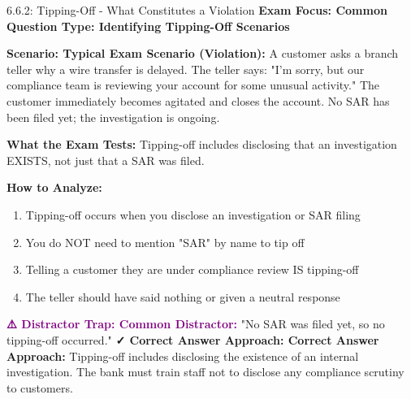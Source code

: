 \documentclass[11pt,a4paper]{beamer}
\newcommand{\examfocus}[1]{\textcolor{orange!80!black}{\textbf{Exam Focus: #1}}}
\newcommand{\trap}[1]{\textcolor{purple}{\textbf{⚠️ Distractor Trap: #1}}}
\newcommand{\correct}[1]{\textcolor{green!50!black}{\textbf{✓ Correct Answer Approach: #1}}}
\newcommand{\scenario}[1]{\textcolor{blue!70!black}{\textbf{Scenario: #1}}}
\begin{document}
	\begin{frame}{6.6.2: Tipping-Off - What Constitutes a Violation}
		\examfocus{Common Question Type: Identifying Tipping-Off Scenarios}
		
		\scenario{Typical Exam Scenario (Violation):}
		A customer asks a branch teller why a wire transfer is delayed. The teller says: "I'm sorry, but our compliance team is reviewing your account for some unusual activity." The customer immediately becomes agitated and closes the account. No SAR has been filed yet; the investigation is ongoing.
		
		\textbf{What the Exam Tests:} Tipping-off includes disclosing that an investigation EXISTS, not just that a SAR was filed.
		
		\textbf{How to Analyze:}
		\begin{enumerate}
			\item Tipping-off occurs when you disclose an investigation or SAR filing
			\item You do NOT need to mention "SAR" by name to tip off
			\item Telling a customer they are under compliance review IS tipping-off
			\item The teller should have said nothing or given a neutral response
		\end{enumerate}
		
		\trap{Common Distractor:} "No SAR was filed yet, so no tipping-off occurred."
		\correct{Correct Answer Approach:} Tipping-off includes disclosing the existence of an internal investigation. The bank must train staff not to disclose any compliance scrutiny to customers.
	\end{frame}
	
\end{document}
